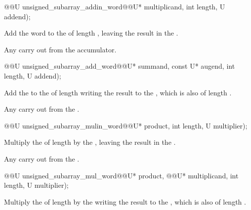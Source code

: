 \begin{addedblock}
\begin{itemdecl}
@@U unsigned_subarray_addin_word@\tcode{\addmodif{(}}@U* multiplicand, int length, U addend);		
\end{itemdecl}

\begin{itemdescr}
\effects Add the word  to the  of length , leaving the result in the .

\returns Any carry out from the accumulator.    	
\end{itemdescr}

\begin{itemdecl}
@@U unsigned_subarray_add_word@\tcode{\addmodif{(}}@U* summand, const U* augend, int length, U addend);    
\end{itemdecl}

\begin{itemdescr}
\effects Add the  to the  of length  writing the result to the , which is also of length .

\returns Any carry out from the .    
\end{itemdescr}

\begin{itemdecl}
@@U unsigned_subarray_mulin_word@\tcode{\addmodif{(}}@U* product, int length, U multiplier);    
\end{itemdecl}

\begin{itemdescr}
\effects Multiply the  of length  by the , leaving the result in the .

\returns Any carry out from the .    
\end{itemdescr}

\begin{itemdecl}
@@U unsigned_subarray_mul_word@\tcode{\addmodif{(}}@U* product, @@U* multiplicand, int length, U multiplier);    
\end{itemdecl}

\begin{itemdescr}
\effects Multiply the  of length  by the  writing the result to the , which is also of length .


\end{itemdescr}
\end{addedblock}
